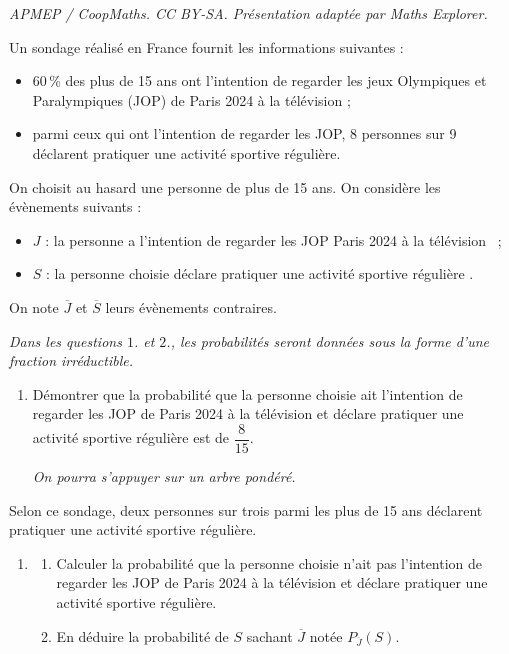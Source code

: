 \documentclass[10pt]{article}
\begin{document}
\noindent\textit{APMEP / CoopMaths. CC BY-SA. Présentation adaptée par Maths Explorer.}\par\medskip
\medskip

Un sondage réalisé en France fournit les informations suivantes :

\begin{itemize}[label=$\bullet~$]
\item 60\,\% des plus de 15 ans ont l'intention de regarder les jeux Olympiques et Paralympiques (JOP) de Paris 2024 à la télévision ;
\item parmi ceux qui ont l'intention de regarder les JOP, 8 personnes sur 9 déclarent pratiquer une activité sportive régulière.
\end{itemize}

On choisit au hasard une personne de plus de 15 ans. On considère les évènements suivants :

\begin{itemize}[label=$\bullet~$]
\item $J$ : \og la personne a l'intention de regarder les JOP Paris 2024 à la télévision \fg\ ;
\item $S$ : \og la personne choisie déclare pratiquer une activité sportive régulière \fg.
\end{itemize}

On note $\overline{J}$ et $\overline{S}$ leurs évènements contraires.

\smallskip

\emph{Dans les questions $1$. et $2$., les probabilités seront données sous la forme d'une fraction irréductible.}

\medskip

\begin{enumerate}
	\item Démontrer que la probabilité que la personne choisie ait l'intention de regarder les JOP de Paris 2024 à la télévision et déclare pratiquer une activité sportive régulière est de $\dfrac{8}{15}$.
	
\emph{On pourra s'appuyer sur un arbre pondéré.}
\end{enumerate}

Selon ce sondage, deux personnes sur trois parmi les plus de 15 ans déclarent pratiquer une activité sportive régulière.

\begin{enumerate}[resume]
\item 
	\begin{enumerate}
		\item Calculer la probabilité que la personne choisie n'ait pas l'intention de regarder les JOP de Paris 2024 à la télévision et déclare pratiquer une activité sportive régulière.
		\item En déduire la probabilité de $S$ sachant $\overline{J}$ notée $P_{\overline{J}}(S)$.
	\end{enumerate}
\end{enumerate}
\end{document}
